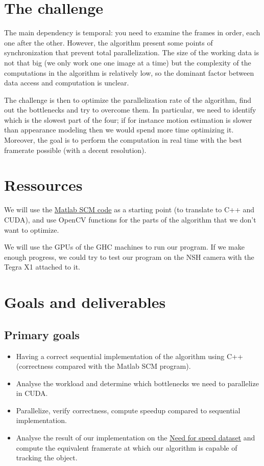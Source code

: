 \documentclass[11pt,english,letter]{article}
\begin{document}
\section{The challenge}

The main dependency is temporal: you need to examine the frames in order, each one after the other. However, the algorithm present some points of synchronization that prevent total parallelization. The size of the working data is not that big (we only work one one image at a time) but the complexity of the computations in the algorithm is relatively low, so the dominant factor between data access and computation is unclear.

The challenge is then to optimize the parallelization rate of the algorithm, find out the bottlenecks and try to overcome them. In particular, we need to identify which is the slowest part of the four; if for instance motion estimation is slower than appearance modeling then we would spend more time optimizing it. Moreover, the goal is to perform the computation in real time with the best framerate possible (with a decent resolution).

\section{Ressources}

We will use the \href{http://faculty.ucmerced.edu/mhyang/project/cvpr12_scm.files/cvpr12_wei_code.zip}{Matlab SCM code} as a starting point (to translate to C++ and CUDA), and use OpenCV functions for the parts of the algorithm that we don't want to optimize.

We will use the GPUs of the GHC machines to run our program. If we make enough progress, we could try to test our program on the NSH camera with the Tegra X1 attached to it.

\section{Goals and deliverables}

\subsection{Primary goals}

\begin{itemize}
    \item Having a correct sequential implementation of the algorithm using C++ (correctness compared with the Matlab SCM program).
    \item Analyse the workload and determine which bottlenecks we need to parallelize in CUDA.
    \item Parallelize, verify correctness, compute speedup compared to sequential implementation.
    \item Analyse the result of our implementation on the \href{http://ci2cv.net/nfs/index.html}{Need for speed dataset} and compute the equivalent framerate at which our algorithm is capable of tracking the object.
\end{itemize}
\end{document}
